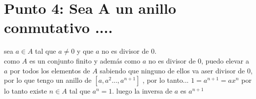 \documentclass[10pt,a4paper]{article} %
\begin{document}
        \section{ Punto 4: Sea A un anillo conmutativo ....}
            sea $a \in A$ tal que $a \not= 0$ y que $a$ no es divisor de $0$.
            \\ como $A$ es un conjunto finito y además como $a$ no es divisor
            de 0, puedo elevar a $a$ por todos los elementos de $A$ sabiendo
            que ninguno de ellos va  aser divisor de 0, por lo que tengo un
            anillo de $[a , a ^{2} ... , a ^{n+1}  ]$ , por lo tanto... $1 = a
            ^{n +1} = ax ^{n}  $
             por lo tanto existe $n \in A$ tal que $a ^{n}  = 1$. luego la
             inversa de $a$ es $a ^{n+1} $





























    \nocite{*}
    
    
\end{document}
